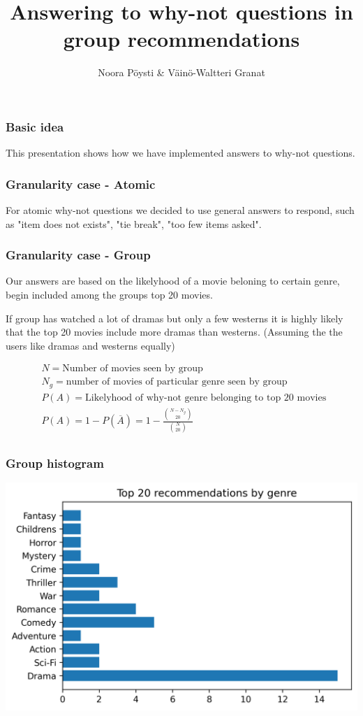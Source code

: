 \documentclass{beamer}
\title{Answering to why-not questions in group recommendations}
\author{Noora Pöysti \& Väinö-Waltteri Granat}
\begin{document}
\frame{\titlepage}


\begin{frame}
    \frametitle{Basic idea}
    This presentation shows how we have implemented answers to why-not questions.
\end{frame}

\begin{frame}
    \frametitle{Granularity case - Atomic}
    For atomic why-not questions we decided to use general answers to respond, such as "item does not exists", "tie break", "too few items asked". 

\end{frame}

\begin{frame}
  \frametitle{Granularity case - Group}

  Our answers are based on the likelyhood of a movie beloning to certain genre, begin included among the groups top 20 movies.
  
  If group has watched a lot of dramas but only a few westerns it is highly likely that the top 20 movies include
   more dramas than westerns. (Assuming the the users like dramas and westerns equally)

  \begin{align*}
    & N = \text{Number of movies seen by group} \\
    & N_g = \text{number of movies of particular genre seen by group} \\
    & P(A) = \text{Likelyhood of why-not genre belonging to top 20 movies }\\
  & P(A) = 1-P(\overline{A}) = 1 - \frac{{N-N_g \choose 20}}{{N \choose 20}} \\
  \end{align*} 
\end{frame}

\begin{frame}
  \frametitle{Group histogram}
  \includegraphics[width=\textwidth]{genre_top20.png}
\end{frame}
\end{document}
